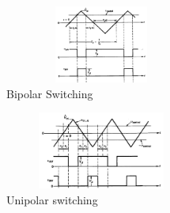 \documentclass[twocolumn, ]{article}
\begin{document}
\begin{figure}[!ht]
	\includegraphics[width=2.5in,height=1in]{bipolar1.png}
	\caption{Bipolar Switching}
\end{figure}
\begin{figure}[!ht]
	\includegraphics[width=2.5in,height=1in]{unipolar1.png}
	\caption{Unipolar switching}
\end{figure}
\end{document}
